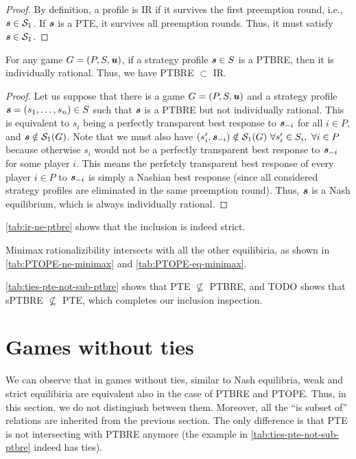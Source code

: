 \begin{proof}
	By definition, a profile is IR if it survives the first preemption round, i.e., $\boldsymbol{\mathit{s}} \in \mathcal{S}_1$.
	If $\boldsymbol{\mathit{s}}$ is a PTE, it survives all preemption rounds.
	Thus, it must satisfy $\boldsymbol{\mathit{s}} \in \mathcal{S}_1$.
\end{proof}

\begin{lemma}
	\label{th:ptbre-subset-ir}
	For any game $G = (P, S, \boldsymbol{\mathit{u}})$, if a strategy profile $\boldsymbol{\mathit{s}} \in S$ is a PTBRE, then it is individually rational.
	Thus, we have PTBRE $\subset$ IR.
\end{lemma}

\begin{proof}
	Let us suppose that there is a game $G = (P, S, \boldsymbol{\mathit{u}})$ and a strategy profile $\boldsymbol{\mathit{s}} = (s_1, \dots, s_n) \in S$ such that $\boldsymbol{\mathit{s}}$ is a PTBRE but not individually rational.
	This is equivalent to $s_i$ being a perfectly transparent best response to $\boldsymbol{\mathit{s}}_{-i}$ for all $i \in P$, and $\boldsymbol{\mathit{s}} \notin \mathcal{S}_1(G)$.
	Note that we must also have $(s_i', \boldsymbol{\mathit{s}}_{-i}) \notin \mathcal{S}_1(G)\ \forall s_i' \in S_i,\ \forall i \in P$ because otherwise $s_i$ would not be a perfectly transparent best response to $\boldsymbol{\mathit{s}}_{-i}$ for some player $i$.
	This means the perfetcly transparent best response of every player $i \in P$ to $\boldsymbol{\mathit{s}}_{-i}$ is simply a Nashian best response (since all considered strategy profiles are eliminated in the same preemption round).
	Thus, $\boldsymbol{\mathit{s}}$ is a Nash equilibrium, which is always individually rational.
\end{proof}

\begin{remark}
	\autoref{tab:ir-ne-ptbre} shows that the inclusion is indeed strict.
\end{remark}

Minimax rationalizibility intersects with all the other equilibiria, as shown in \autoref{tab:PTOPE-ne-minimax} and \autoref{tab:PTOPE-eq-minimax}.

\autoref{tab:ties-pte-not-sub-ptbre} shows that PTE $\not\subseteq$ PTBRE, and TODO shows that sPTBRE $\not\subseteq$ PTE, which completes our inclusion inspection.


\section{Games without ties}
We can observe that in games without ties, similar to Nash equilibria, weak and strict equilibiria are equivalent also in the case of PTBRE and PTOPE.
Thus, in this section, we do not distingiush between them.
Moreover, all the \enquote{is subset of} relations are inherited from the previous section.
The only difference is that PTE is not intersecting with PTBRE anymore (the example in \autoref{tab:ties-pte-not-sub-ptbre} indeed has ties).


